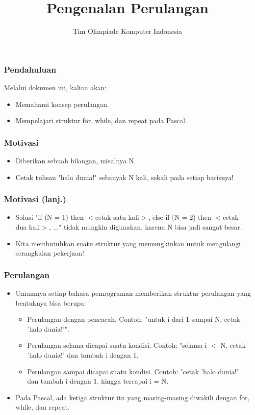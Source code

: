 \documentclass{beamer}
\title{Pengenalan Perulangan}
\author{Tim Olimpiade Komputer Indonesia}
\begin{document}
\begin{frame}
\titlepage
\end{frame}

\begin{frame}
\frametitle{Pendahuluan}
Melalui dokumen ini, kalian akan:
\begin{itemize}
	\item Memahami konsep perulangan.
	\item Mempelajari struktur for, while, dan repeat pada Pascal.
\end{itemize}
\end{frame}

\begin{frame}
\frametitle{Motivasi}
\begin{itemize}
	\item Diberikan sebuah bilangan, misalnya N.
	\item Cetak tulisan "halo dunia!" sebanyak N kali, sekali pada setiap barisnya!
\end{itemize}
\end{frame}

\begin{frame}
\frametitle{Motivasi (lanj.)}
\begin{itemize}
	\item Solusi "if (N = 1) then $<$cetak satu kali$>$, else if (N = 2) then $<$cetak dua kali$>$, ..." tidak mungkin digunakan, karena N bisa jadi sangat besar.
	\item Kita membutuhkan suatu struktur yang memungkinkan untuk mengulangi serangkaian pekerjaan!
\end{itemize}
\end{frame}

\begin{frame}
\frametitle{Perulangan}
\begin{itemize}
	\item Umumnya setiap bahasa pemrograman memberikan struktur perulangan yang bentuknya bisa berupa:
	\begin{itemize}
		\item Perulangan dengan pencacah. Contoh: "untuk i dari 1 sampai N, cetak 'halo dunia!'".
		\item Perulangan selama dicapai suatu kondisi. Contoh: "selama i $<$ N, cetak 'halo dunia!' dan tambah i dengan 1.
		\item Perulangan sampai dicapai suatu kondisi. Contoh: "cetak 'halo dunia!' dan tambah i dengan 1, hingga tercapai i = N.
	\end{itemize}
	\item Pada Pascal, ada ketiga struktur itu yang masing-masing diwakili dengan \alert{for}, \alert{while}, dan \alert{repeat}. 
\end{itemize}
\end{frame}
\end{document}
